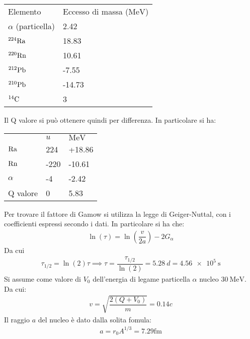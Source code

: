 \documentclass[../main.tex]{subfiles}
\begin{document}
\begin{svol}
			\begin{center}
			\begin{tabular}{ll}
				Elemento & Eccesso di massa ($\si{\mega\electronvolt}$) \\
				$ \alpha $ (particella) & 2.42 \\
				$ \mathrm{^{224}Ra} $ & 18.83 \\
				$ \mathrm{^{220}Rn} $ & 10.61 \\
				$ \mathrm{^{212}Pb} $ & -7.55 \\
				$ \mathrm{^{210}Pb} $ & -14.73 \\
				$ \mathrm{^{14}C} $ & 3 \\
			\end{tabular} 
			\end{center}
			Il Q valore si può ottenere quindi per differenza. In particolare si ha:
			\begin{center}
				\begin{tabular}{lll}
					& $ \si{u} $ & $ \si{\mega\electronvolt} $ \\
					$ \mathrm{Ra} $  & 224 & +18.86\\
					$ \mathrm{Rn} $  & -220 & -10.61 \\
					$ \alpha $ & -4 & -2.42 \\\hline
					Q valore & 0 & 5.83 \\
				\end{tabular}
			\end{center}
			Per trovare il fattore di Gamow si utilizza la legge di Geiger-Nuttal, con i coefficienti espressi secondo i dati. In particolare si ha che:
			\begin{gather}
				\ln(\tau)=\ln\left(\dfrac{v}{2a}\right)-2G_{\alpha}
			\end{gather}
			Da cui
			\begin{gather}
			 \tau_{1/2}=\ln(2)\tau\implies\tau=\dfrac{\tau_{1/2}}{\ln(2)}=\SI{5.28}{d}=\SI{4.56e5}{\second}
			\end{gather}
			Si assume come valore di $ V_{0} $ dell'energia di legame particella $ \alpha $ nucleo $ \SI{30}{\mega\electronvolt} $. Da cui:
			\begin{gather}
			v=\sqrt{\dfrac{2(Q+V_{0})}{m}}=0.14c
			\end{gather} 
			Il raggio $ a $ del nucleo è dato dalla solita fomula:
			\begin{gather}
				a=r_{0}A^{1/3}=7.29\si{\femto\meter}
			\end{gather}
			

\end{svol}
\end{document}
